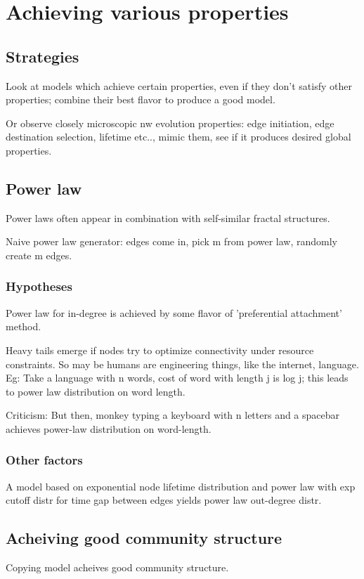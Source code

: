 \documentclass[oneside, article]{memoir}
\begin{document}
\section{Achieving various properties}
\subsection{Strategies}
Look at models which achieve certain properties, even if they don't satisfy other properties; combine their best flavor to produce a good model.

Or observe closely microscopic nw evolution properties: edge initiation, edge destination selection, lifetime etc.., mimic them, see if it produces desired global properties.

\subsection{Power law}
Power laws often appear in combination with self-similar fractal structures.

Naive power law generator: edges come in, pick m from power law, randomly create m edges.

\subsubsection{Hypotheses}
Power law for in-degree is achieved by some flavor of 'preferential attachment' method.

Heavy tails emerge if nodes try to optimize connectivity under resource constraints. So may be humans are engineering things, like the internet, language. Eg: Take a language with n words, cost of word with length j is log j; this leads to power law distribution on word length.

Criticism: But then, monkey typing a keyboard with n letters and a spacebar achieves power-law distribution on word-length.

\subsubsection{Other factors}
A model based on exponential node lifetime distribution and power law with exp cutoff distr for time gap between edges yields power law out-degree distr.

\subsection{Acheiving good community structure}
Copying model acheives good community structure.
\end{document}
